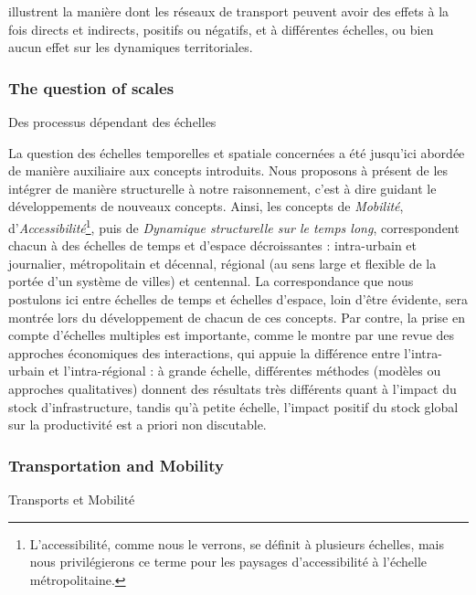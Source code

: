 {illustrent la manière dont les réseaux de transport peuvent avoir des effets à la fois directs et indirects, positifs ou négatifs, et à différentes échelles, ou bien aucun effet sur les dynamiques territoriales.
}





\subsubsection{The question of scales}{Des processus dépendant des échelles}

La question des échelles temporelles et spatiale concernées a été jusqu'ici abordée de manière auxiliaire aux concepts introduits. Nous proposons à présent de les intégrer de manière structurelle à notre raisonnement, c'est à dire guidant le développements de nouveaux concepts. Ainsi, les concepts de \emph{Mobilité}, d'\emph{Accessibilité}\footnote{L'accessibilité, comme nous le verrons, se définit à plusieurs échelles, mais nous privilégierons ce terme pour les paysages d'accessibilité à l'échelle métropolitaine.}, puis de \emph{Dynamique structurelle sur le temps long}, correspondent chacun à des échelles de temps et d'espace décroissantes : intra-urbain et journalier, métropolitain et décennal, régional (au sens large et flexible de la portée d'un système de villes) et centennal. La correspondance que nous postulons ici entre échelles de temps et échelles d'espace, loin d'être évidente, sera montrée lors du développement de chacun de ces concepts. Par contre, la prise en compte d'échelles multiples est importante, comme le montre \cite{RIETVELD1994329} par une revue des approches économiques des interactions, qui appuie la différence entre l'intra-urbain et l'intra-régional : à grande échelle, différentes méthodes (modèles ou approches qualitatives) donnent des résultats très différents quant à l'impact du stock d'infrastructure, tandis qu'à petite échelle, l'impact positif du stock global sur la productivité est a priori non discutable.






\subsubsection{Transportation and Mobility}{Transports et Mobilité}


